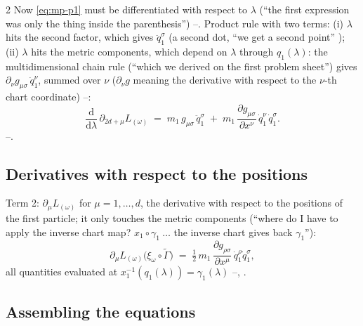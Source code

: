 \begin{paracol}{2}
Now \eqref{eq:mp-p1} must be differentiated with respect to $\lambda$ (``the first expression was only the thing inside the parenthesis'') --. Product rule with two terms: (i) $\lambda$ hits the second factor, which gives $\ddot q_1^\sigma$ (a second dot, ``we get a second point'' ); (ii) $\lambda$ hits the metric components, which depend on $\lambda$ through $q_1(\lambda)$: the multidimensional chain rule (``which we derived on the first problem sheet'') gives $\partial_\nu g_{\mu\sigma}\,\dot q_1^\nu$, summed over $\nu$ ($\partial_\nu g$ meaning the derivative with respect to the $\nu$-th chart coordinate) --:
\begin{equation}\label{eq:mp-dterm1}
  \frac{\mathrm d}{\mathrm d\lambda}\,\partial_{2d+\mu}L_{(\omega)}\;=\;m_1\,g_{\mu\sigma}\,\ddot q_1^\sigma\;+\;m_1\,\frac{\partial g_{\mu\sigma}}{\partial x^\nu}\,\dot q_1^\nu\,\dot q_1^\sigma .
\end{equation}
--.

\subsection{Derivatives with respect to the positions}\label{ssec:mp-dalpha}

Term 2: $\partial_\mu L_{(\omega)}$ for $\mu=1,\dots,d$, the derivative with respect to the positions of the first particle; it only touches the metric components (``where do I have to apply the inverse chart map? $x_1\circ\gamma_1\ \dots$ the inverse chart gives back $\gamma_1$''):
\begin{equation}\label{eq:mp-dterm2}
  \partial_\mu L_{(\omega)}\bigl(\xi_\omega\circ\tilde\Gamma\bigr)\;=\;\tfrac12\,m_1\,\frac{\partial g_{\rho\sigma}}{\partial x^\mu}\,\dot q_1^\rho\dot q_1^\sigma ,
\end{equation}
all quantities evaluated at $x_1^{-1}(q_1(\lambda))=\gamma_1(\lambda)$ --, .

\subsection{Assembling the equations}\label{ssec:mp-assemble}


\end{paracol}

